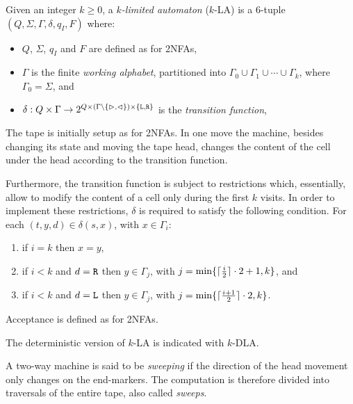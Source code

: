 \begin{defn}
	Given an integer $k\ge0$, a \emph{$k$-limited automaton} ($k$-LA) is a 6-tuple $(Q,\Sigma,\Gamma,\delta,q_I,F)$ where:
	\begin{itemize}
		\item $Q$, $\Sigma$, $q_I$ and $F$ are defined as for 2NFAs,
		\item $\Gamma$ is the finite \emph{working alphabet}, partitioned into $\Gamma_0\cup\Gamma_1\cup\cdots\cup\Gamma_k$, where $\Gamma_0=\Sigma$, and
		\item $\delta:Q\times\Gamma\to2^{Q\times(\Gamma\setminus\{\rhd,\lhd\})\times\{\mathtt L,\mathtt R\}}$ is the \emph{transition function},
	\end{itemize}
	The tape is initially setup as for 2NFAs.
	In one move the machine, besides changing its state and moving the tape head, changes the content of the cell under the head according to the transition function.

	Furthermore, the transition function is subject to restrictions which, essentially, allow to modify the content of a cell only during the first $k$ visits.
	In order to implement these restrictions, $\delta$ is required to satisfy the following condition. For each $(t,y,d)\in\delta(s,x)$, with $x\in\Gamma_i$:
	\begin{enumerate}[(1)]
		\item if $i=k$ then $x=y$,
		\item if $i<k$ and $d=\mathtt R$ then $y\in\Gamma_j$, with $j=\min\{\lceil \frac{i}{2} \rceil\cdot 2+1,k\}$, and
		\item if $i<k$ and $d=\mathtt L$ then $y\in\Gamma_j$, with $j=\min\{\lceil \frac{i+1}{2} \rceil\cdot 2,k\}$.
	\end{enumerate}

	\noindent Acceptance is defined as for 2NFAs.

	\noindent The deterministic version of $k$-LA is indicated with $k$-DLA.
\end{defn}



\begin{defn}
	A two-way machine is said to be \emph{sweeping} if the direction of the head movement only changes on the end-markers.
	The computation is therefore divided into traversals of the entire tape, also called \emph{sweeps}.
\end{defn}

